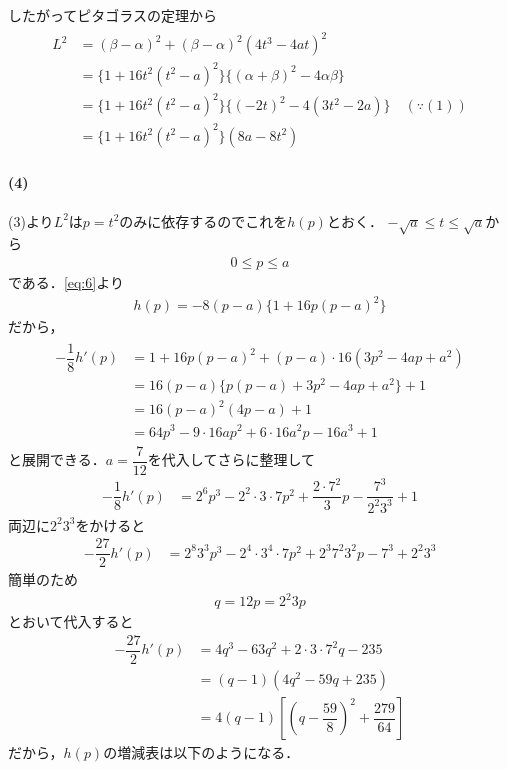 \documentclass[../../main.tex]{subfiles}
\begin{document}
したがってピタゴラスの定理から
\begin{align}
  \begin{split}
    L^2
    &=(\beta-\alpha)^2+(\beta-\alpha)^2(4t^3-4at)^2 \\
    &=\{1+16t^2(t^2-a)^2\}\{(\alpha+\beta)^2-4\alpha\beta\} \\
    &=\{1+16t^2(t^2-a)^2\}\{(-2t)^2-4(3t^2-2a)\} \quad(\because(1)) \\
    &=\{1+16t^2(t^2-a)^2\}(8a-8t^2)
  \end{split} \label{eq:6}
\end{align}

\paragraph{(4)}
(3)より$L^2$は$p=t^2$のみに依存するのでこれを$h(p)$とおく．
$-\sqrt{a}\le t\le\sqrt{a}$から
\begin{align}
  0\le p\le a \label{eq:7}
\end{align}
である．\cref{eq:6}より
\begin{align}
  h(p)=-8(p-a)\{1+16p(p-a)^2\}
\end{align}
だから，
\begin{align}
  \begin{split}
    -\dfrac{1}{8}h'(p)
    &=1+16p(p-a)^2+(p-a)\cdot16(3p^2-4ap+a^2) \\
    &=16(p-a)\{p(p-a)+3p^2-4ap+a^2\}+1 \\
    &=16(p-a)^2(4p-a)+1 \\
    &=64p^3-9\cdot 16 ap^2 + 6\cdot 16a^2p -16a^3 + 1
  \end{split}
\end{align}
と展開できる．$a=\dfrac{7}{12}$を代入してさらに整理して
\begin{align}
  -\dfrac{1}{8}h'(p)
  &=2^6p^3 - 2^2\cdot 3\cdot 7 p^2 + \dfrac{2\cdot 7^2}{3}p - \dfrac{7^3}{2^{2}3^3} + 1
\end{align}
両辺に$2^{2}3^{3}$をかけると
\begin{align}
  -\dfrac{27}{2}h'(p)
  &=2^{8}3^{3}p^3 - 2^{4}\cdot 3^{4}\cdot 7 p^2 + 2^{3}7^{2}3^{2}p - 7^{3} + 2^{2}3^{3}
\end{align}
簡単のため
\begin{align}
  q = 12 p = 2^{2}3p
\end{align}
とおいて代入すると
\begin{align}
  -\dfrac{27}{2}h'(p)
  &=4q^3 - 63q^2 + 2\cdot 3\cdot 7^2q - 235 \\
  &=\left(q-1\right)\left(4q^2-59q+235\right) \\
  &=4\left(q-1\right)\left[\left(q-\dfrac{59}{8}\right)^2+\dfrac{279}{64}\right]
\end{align}
だから，$h(p)$の増減表は以下のようになる．
\end{document}
